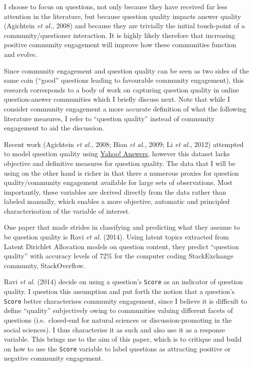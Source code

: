\documentclass[11pt,preprint, authoryear]{article}
\numberwithin{equation}{section}
\numberwithin{figure}{section}
\begin{document}
I choose to focus on questions, not only because they have received far
less attention in the literature, but because question quality impacts
answer quality (Agichtein \emph{et al.}, 2008) and because they are
trivially the initial touch-point of a community/questioner interaction.
It is highly likely therefore that increasing positive community
engagement will improve how these communities function and evolve.

Since community engagement and question quality can be seen as two sides
of the same coin (``good'' questions leading to favourable community
engagement), this research corresponds to a body of work on capturing
question quality in online question-answer communities which I briefly
discuss next. Note that while I consider community engagement a more
accurate definition of what the following literature measures, I refer
to ``question quality'' instead of community engagement to aid the
discussion.

Recent work (Agichtein \emph{et al.}, 2008; Bian \emph{et al.}, 2009; Li
\emph{et al.}, 2012) attempted to model question quality using
\href{http://answers.yahoo.com}{Yahoo! Answers}, however this dataset
lacks objective and definitive measures for question quality. The data
that I will be using on the other hand is richer in that there a
numerous proxies for question quality/community engagement available for
large sets of observations. Most importantly, these variables are
derived directly from the data rather than labeled manually, which
enables a more objective, automatic and principled characterisation of
the variable of interest.

One paper that made strides in classifying and predicting what they
assume to be question quality is Ravi \emph{et al.} (2014). Using latent
topics extracted from Latent Dirichlet Allocation models on question
content, they predict ``question quality'' with accuracy levels of 72\%
for the computer coding StackExchange community, StackOverflow.

Ravi \emph{et al.} (2014) decide on using a question's \texttt{Score} as
an indicator of question quality. I question this assumption and put
forth the notion that a question's \texttt{Score} better characterises
community engagement, since I believe it is difficult to define
``quality'' subjectively owing to communities valuing different facets
of questions (i.e.~closed-end for natural sciences or
discussion-promoting in the social sciences). I thus characterise it as
such and also use it as a response variable. This brings me to the aim
of this paper, which is to critique and build on how to use the
\texttt{Score} variable to label questions as attracting positive or
negative community engagement.
\end{document}
